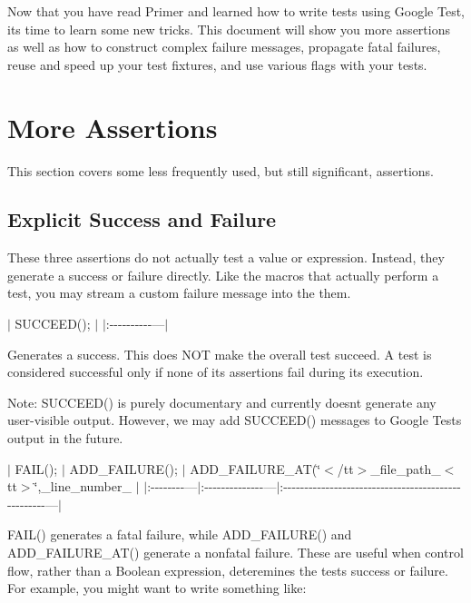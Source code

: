 Now that you have read Primer and learned how to write tests using Google Test, it\textquotesingle{}s time to learn some new tricks. This document will show you more assertions as well as how to construct complex failure messages, propagate fatal failures, reuse and speed up your test fixtures, and use various flags with your tests.

\section*{More Assertions}

This section covers some less frequently used, but still significant, assertions.

\subsection*{Explicit Success and Failure}

These three assertions do not actually test a value or expression. Instead, they generate a success or failure directly. Like the macros that actually perform a test, you may stream a custom failure message into the them.

$\vert$ {\ttfamily S\+U\+C\+C\+E\+E\+D();} $\vert$ $\vert$\+:-\/-\/-\/-\/-\/-\/-\/-\/-\/-\/---$\vert$

Generates a success. This does N\+OT make the overall test succeed. A test is considered successful only if none of its assertions fail during its execution.

Note\+: {\ttfamily S\+U\+C\+C\+E\+E\+D()} is purely documentary and currently doesn\textquotesingle{}t generate any user-\/visible output. However, we may add {\ttfamily S\+U\+C\+C\+E\+E\+D()} messages to Google Test\textquotesingle{}s output in the future.

$\vert$ {\ttfamily F\+A\+I\+L();} $\vert$ {\ttfamily A\+D\+D\+\_\+\+F\+A\+I\+L\+U\+R\+E();} $\vert$ {\ttfamily A\+D\+D\+\_\+\+F\+A\+I\+L\+U\+R\+E\+\_\+\+AT(\char`\"{}$<$/tt$>$\+\_\+file\+\_\+path\+\_\+$<$tt$>$\char`\"{},}\+\_\+line\+\_\+number\+\_\+{\ttfamily );} $\vert$ $\vert$\+:-\/-\/-\/-\/-\/-\/-\/-\/---$\vert$\+:-\/-\/-\/-\/-\/-\/-\/-\/-\/-\/-\/-\/-\/-\/---$\vert$\+:-\/-\/-\/-\/-\/-\/-\/-\/-\/-\/-\/-\/-\/-\/-\/-\/-\/-\/-\/-\/-\/-\/-\/-\/-\/-\/-\/-\/-\/-\/-\/-\/-\/-\/-\/-\/-\/-\/-\/-\/-\/-\/-\/-\/-\/-\/-\/-\/-\/-\/-\/---$\vert$

{\ttfamily F\+A\+I\+L()} generates a fatal failure, while {\ttfamily A\+D\+D\+\_\+\+F\+A\+I\+L\+U\+R\+E()} and {\ttfamily A\+D\+D\+\_\+\+F\+A\+I\+L\+U\+R\+E\+\_\+\+A\+T()} generate a nonfatal failure. These are useful when control flow, rather than a Boolean expression, deteremines the test\textquotesingle{}s success or failure. For example, you might want to write something like\+:


